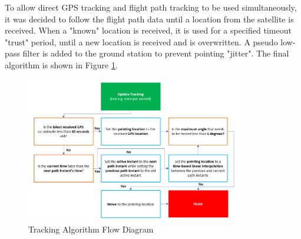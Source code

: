 To allow direct GPS tracking and flight path tracking to be used simultaneously, it was decided to follow the flight path data until a location from the satellite is received. When a "known" location is received, it is used for a specified timeout "trust" period, until a new location is received and is overwritten. A pseudo low-pass filter is added to the ground station to prevent pointing "jitter". The final algorithm is shown in Figure \ref{fig:trackingAlgorithm}.

\begin{figure}[!htb]
  \centering
  \includegraphics[width=0.85\textwidth]{trackingAlgorithm}
  \caption{Tracking Algorithm Flow Diagram}
  \label{fig:trackingAlgorithm}
\end{figure}